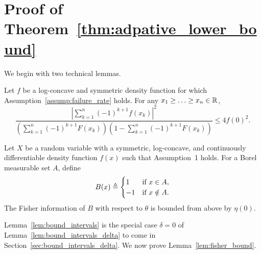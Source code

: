 \section{Proof of Theorem~\ref{thm:adpative_lower_bound}}
\label{proof:thm:adpative_lower_bound}

We begin with two technical lemmas.
\begin{lem} \label{lem:bound_intervals}
  Let $f$ be a log-concave and symmetric density function
  for which Assumption~\ref{assump:failure_rate} holds. For any $x_1 \geq
  \ldots \geq x_n \in \mathbb{R}$,
  \begin{equation}
    \frac{ \left| \sum_{k=1}^n (-1)^{k+1} f(x_k) \right|^2 }{
      \left( \sum_{k=1}^n (-1)^{k+1} F(x_k) \right) \left(1- \sum_{k=1}^n (-1)^{k+1} F(x_k) \right) } 
    \leq  4f(0)^2.
    \label{eq:lem_bound_intervals}
  \end{equation}
\end{lem}
\begin{lem} \label{lem:fisher_bound}
  Let $X$ be a random variable with a symmetric, log-concave, and
  continuously differentiable density function $f(x)$ such that Assumption~1 holds. For a Borel measurable set $A$, define
  \begin{equation*}
    B(x) \triangleq \begin{cases} 1
      & \mbox{if} ~x \in A, \\
      -1 & \mbox{if}~ x \notin A.
    \end{cases}
  \end{equation*}
  The Fisher information of $B$ with respect to $\theta$ is bounded from above by $\eta(0)$.
\end{lem}

Lemma~\ref{lem:bound_intervals} is the special case $\delta = 0$ of
Lemma~\ref{lem:bound_intervals_delta} to come in
Section~\ref{sec:bound_intervals_delta}. We now prove
Lemma~\ref{lem:fisher_bound}.

